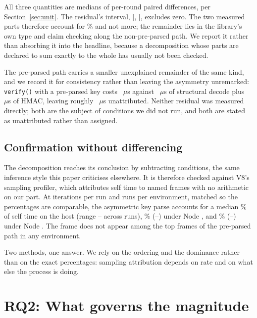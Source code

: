 \documentclass[preprint,12pt,authoryear]{elsarticle}
\begin{document}
All three quantities are medians of per-round paired differences, per
Section~\ref{sec:unit}. The residual's interval,
[\DecompResidualCiLo, \DecompResidualCiHi], excludes zero. The two measured
parts therefore account for \DecompExplainedPct\% and not more; the remainder
lies in the library's own type and claim checking along the non-pre-parsed path.
We report it rather than absorbing it into the headline, because a decomposition
whose parts are declared to sum exactly to the whole has usually not been
checked.

The pre-parsed path carries a smaller unexplained remainder of the same kind, and
we record it for consistency rather than leaving the asymmetry unremarked:
\texttt{verify()} with a pre-parsed key costs \HostJwtPreparsed~$\mu$s against
\HostDecodeOnly~$\mu$s of structural decode plus \HostHmacKeyObject~$\mu$s of
HMAC, leaving roughly \PreparsedUnattributed~$\mu$s unattributed. Neither
residual was measured directly; both are the subject of conditions we did not
run, and both are stated as unattributed rather than assigned.

\subsection{Confirmation without differencing}

The decomposition reaches its conclusion by subtracting conditions, the same
inference style this paper criticises elsewhere. It is therefore checked against
V8's sampling profiler, which attributes self time to named frames with no
arithmetic on our part. At \ProfIterations{} iterations per run and
\ProfRepeats{} runs per environment, matched so the percentages are comparable,
the asymmetric key parse accounts for a median \ProfHostPct\% of self time on
the host (range \ProfHostPctLo--\ProfHostPctHi{} across runs),
\ProfEighteenPct\% (\ProfEighteenPctLo--\ProfEighteenPctHi) under Node
\NodeEighteenNodeMajor, and \ProfTwentySixPct\%
(\ProfTwentySixPctLo--\ProfTwentySixPctHi) under Node
\NodeTwentySixMuslNodeMajor. The frame does not appear among the top frames of
the pre-parsed path in any environment.

Two methods, one answer. We rely on the ordering and the dominance rather than on
the exact percentages: sampling attribution depends on rate and on what else the
process is doing.

\section{RQ2: What governs the magnitude}\label{sec:rq2}
\end{document}
